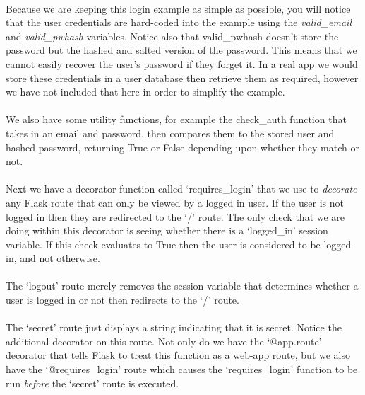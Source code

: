 \documentclass[12pt, a4paper, oneside]{book}
\begin{document}
\paragraph{} Because we are keeping this login example as simple as possible, you will notice that the user credentials are hard-coded into the example using the \emph{valid\_email} and \emph{valid\_pwhash} variables. Notice also that valid\_pwhash doesn't store the password but the hashed and salted version of the password. This means that we cannot easily recover the user's password if they forget it. In a real app we would store these credentials in a user database then retrieve them as required, however we have not included that here in order to simplify the example.

\paragraph{} We also have some utility functions, for example the check\_auth function that takes in an email and password, then compares them to the stored user and hashed password, returning True or False depending upon whether they match or not. 
\paragraph{} Next we have a decorator function called `requires\_login' that we use to \emph{decorate} any Flask route that can only be viewed by a logged in user. If the user is not logged in then they are redirected to the `/' route. The only check that we are doing within this decorator is seeing whether there is a `logged\_in' session variable. If this check evaluates to True then the user is considered to be logged in, and not otherwise.

\paragraph{} The `logout' route merely removes the session variable that determines whether a user is logged in or not then redirects to the `/' route.

\paragraph{} The `secret' route just displays a string indicating that it is secret. Notice the additional decorator on this route. Not only do we have the `@app.route' decorator that tells Flask to treat this function as a web-app route, but we also have the `@requires\_login' route which causes the `requires\_login' function to be run \emph{before} the `secret' route is executed.
\end{document}
